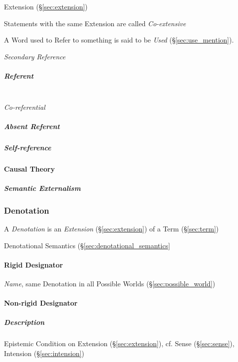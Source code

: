 Extension (\S\ref{sec:extension})

Statements with the same Extension are called \emph{Co-extensive}

A Word used to Refer to something is said to be \emph{Used}
(\S\ref{sec:use_mention}).

\emph{Secondary Reference}

\subparagraph{Referent}\label{sec:referent}
\hfill \\

\emph{Co-referential}

\subparagraph{Absent Referent}\label{sec:absent_referent}

\subparagraph{Self-reference}\label{sec:self_reference}



\paragraph{Causal Theory}\label{sec:causal_reference}

\subparagraph{Semantic Externalism}\label{sec:semantic_externalism}



\subsubsection{Denotation}\label{sec:denotation}

A \emph{Denotation} is an \emph{Extension} (\S\ref{sec:extension}) of
a Term (\S\ref{sec:term})

Denotational Semantics (\S\ref{sec:denotational_semantics}



\paragraph{Rigid Designator}\label{sec:rigid_designator}

\emph{Name}, same Denotation in all Possible Worlds
(\S\ref{sec:possible_world})



\paragraph{Non-rigid Designator}\label{sec:nonrigid_designator}

\subparagraph{Description}\label{sec:description}
\cite{chalmers02}

Epistemic Condition on Extension (\S\ref{sec:extension}), cf. Sense
(\S\ref{sec:sense}), Intension (\S\ref{sec:intension})

